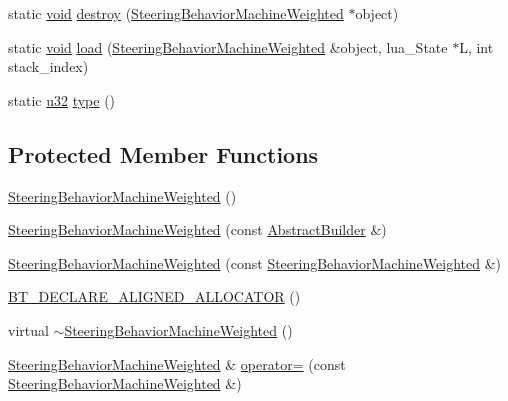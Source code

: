 \begin{DoxyCompactItemize}
static \mbox{\hyperlink{_thread_8h_af1e856da2e658414cb2456cb6f7ebc66}{void}} \mbox{\hyperlink{classnjli_1_1_steering_behavior_machine_weighted_a63d165fd5d27159273375cc07efb3e7b}{destroy}} (\mbox{\hyperlink{classnjli_1_1_steering_behavior_machine_weighted}{Steering\+Behavior\+Machine\+Weighted}} $\ast$object)
\item 
static \mbox{\hyperlink{_thread_8h_af1e856da2e658414cb2456cb6f7ebc66}{void}} \mbox{\hyperlink{classnjli_1_1_steering_behavior_machine_weighted_adfde67f6ffcdc0241c4415afb53d3bf9}{load}} (\mbox{\hyperlink{classnjli_1_1_steering_behavior_machine_weighted}{Steering\+Behavior\+Machine\+Weighted}} \&object, lua\+\_\+\+State $\ast$L, int stack\+\_\+index)
\item 
static \mbox{\hyperlink{_util_8h_a10e94b422ef0c20dcdec20d31a1f5049}{u32}} \mbox{\hyperlink{classnjli_1_1_steering_behavior_machine_weighted_a695be63ffdee7fbf65aa90a7e0ceeb56}{type}} ()
\end{DoxyCompactItemize}
\subsection*{Protected Member Functions}
\begin{DoxyCompactItemize}
\item 
\mbox{\hyperlink{classnjli_1_1_steering_behavior_machine_weighted_ac119f176d0a5f0d95253f2e192ac847b}{Steering\+Behavior\+Machine\+Weighted}} ()
\item 
\mbox{\hyperlink{classnjli_1_1_steering_behavior_machine_weighted_a9856a0e4220b43e1c38d4b771e69d301}{Steering\+Behavior\+Machine\+Weighted}} (const \mbox{\hyperlink{classnjli_1_1_abstract_builder}{Abstract\+Builder}} \&)
\item 
\mbox{\hyperlink{classnjli_1_1_steering_behavior_machine_weighted_afaa410dfd1bc2fae9ee6376a9e98ebd7}{Steering\+Behavior\+Machine\+Weighted}} (const \mbox{\hyperlink{classnjli_1_1_steering_behavior_machine_weighted}{Steering\+Behavior\+Machine\+Weighted}} \&)
\item 
\mbox{\hyperlink{classnjli_1_1_steering_behavior_machine_weighted_a1a19361ce0c0c4a674ad8c043e08968c}{B\+T\+\_\+\+D\+E\+C\+L\+A\+R\+E\+\_\+\+A\+L\+I\+G\+N\+E\+D\+\_\+\+A\+L\+L\+O\+C\+A\+T\+OR}} ()
\item 
virtual \mbox{\hyperlink{classnjli_1_1_steering_behavior_machine_weighted_aec90ccedb6481d8eab81a37b4aaf4e13}{$\sim$\+Steering\+Behavior\+Machine\+Weighted}} ()
\item 
\mbox{\hyperlink{classnjli_1_1_steering_behavior_machine_weighted}{Steering\+Behavior\+Machine\+Weighted}} \& \mbox{\hyperlink{classnjli_1_1_steering_behavior_machine_weighted_aae65f51800847fc35a641eb6c76d0de8}{operator=}} (const \mbox{\hyperlink{classnjli_1_1_steering_behavior_machine_weighted}{Steering\+Behavior\+Machine\+Weighted}} \&)
\end{DoxyCompactItemize}
